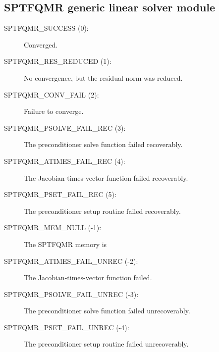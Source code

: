 \documentclass[letterpaper,10pt,english]{sphinxmanual}
\begin{document}
\subsection{SPTFQMR generic linear solver module}
\label{Constants:sptfqmr-generic-linear-solver-module}\begin{description}
\item[{SPTFQMR\_SUCCESS  (0):}] \leavevmode
Converged.

\item[{SPTFQMR\_RES\_REDUCED  (1):}] \leavevmode
No convergence, but the residual norm
was reduced.

\item[{SPTFQMR\_CONV\_FAIL  (2):}] \leavevmode
Failure to converge.

\item[{SPTFQMR\_PSOLVE\_FAIL\_REC  (3):}] \leavevmode
The preconditioner solve function
failed recoverably.

\item[{SPTFQMR\_ATIMES\_FAIL\_REC  (4):}] \leavevmode
The Jacobian-times-vector function
failed recoverably.

\item[{SPTFQMR\_PSET\_FAIL\_REC  (5):}] \leavevmode
The preconditioner setup routine
failed recoverably.

\item[{SPTFQMR\_MEM\_NULL  (-1):}] \leavevmode
The SPTFQMR memory is 

\item[{SPTFQMR\_ATIMES\_FAIL\_UNREC  (-2):}] \leavevmode
The Jacobian-times-vector
function failed.

\item[{SPTFQMR\_PSOLVE\_FAIL\_UNREC  (-3):}] \leavevmode
The preconditioner solve function
failed unrecoverably.

\item[{SPTFQMR\_PSET\_FAIL\_UNREC  (-4):}] \leavevmode
The preconditioner setup routine
failed unrecoverably.

\end{description}
\end{document}
